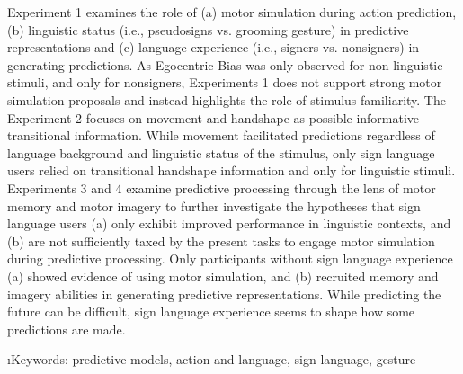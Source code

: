             \restoregeometry \doublespacing Experiment 1 examines the role of (a) motor simulation during action prediction, (b) linguistic status (i.e., pseudosigns vs. grooming gesture) in predictive representations and (c) language experience (i.e., signers vs. nonsigners) in generating predictions. As Egocentric Bias was only observed for non-linguistic stimuli, and only for nonsigners, Experiments 1 does not support strong motor simulation proposals and instead highlights the role of stimulus familiarity. The Experiment 2 focuses on movement and handshape as possible informative transitional information. While movement facilitated predictions regardless of language background and linguistic status of the stimulus, only sign language users relied on transitional handshape information and only for linguistic stimuli. Experiments 3 and 4 examine predictive processing through the lens of motor memory and motor imagery to further investigate the hypotheses that sign language users (a) only exhibit improved performance in linguistic contexts, and (b) are not sufficiently taxed by the present tasks to engage motor simulation during predictive processing. Only participants without sign language experience (a) showed evidence of using motor simulation, and (b) recruited memory and imagery abilities in generating predictive representations. While predicting the future can be difficult, sign language experience seems to shape how some predictions are made.\par
            \begin{flushleft}
            \i{Keywords:} predictive models, action and language, sign language, gesture
            \end{flushleft}
            \newpage
        


